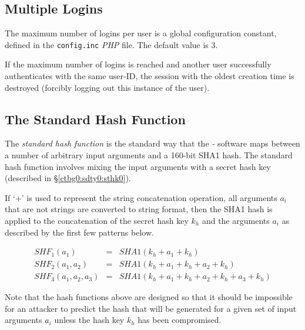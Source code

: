 \subsection{Multiple Logins}
\label{ctbg0:sddc0:smlo0}

The maximum number of logins per user is a global configuration
constant, defined in the \texttt{config.inc} \emph{PHP} file.
The default value is 3.

If the maximum number of logins is reached and another user 
successfully authenticates with the
same user-ID, the session with the oldest creation time is destroyed (forcibly
logging out this instance of the user).


\subsection{The Standard Hash Function}
\label{ctbg0:sddc0:sshf0}

The \emph{standard hash function} is the
standard way that the \emph{\productbasename{}-\productversion{}} software
maps between a number of arbitrary input arguments and a 160-bit
SHA1 hash.  The standard hash function involves mixing
the input arguments with a secret hash key
(described in \S{}\ref{ctbg0:sdty0:sthk0}).

If `+' is used to represent the string concatenation operation, all
arguments $a_i$ that are not strings are converted to string format, then the
SHA1 hash is applied to the concatenation of the secret hash key $k_h$ and the
arguments $a_i$ as described by the first few patterns below.

\begin{eqnarray}
\nonumber
SHF_1(a_1)              & = & SHA1(k_h + a_1 + k_h) \\
\label{eq:ctbg0:sddc0:sshf0:01}
SHF_2(a_1, a_2)         & = & SHA1(k_h + a_1 + k_h + a_2 + k_h) \\
\nonumber
SHF_3(a_1, a_2, a_3)    & = & SHA1(k_h + a_1 + k_h + a_2 + k_h + a_3 + k_h)
\end{eqnarray}

Note that the hash functions above are designed so that it should be
impossible for an attacker to predict the hash that will be generated
for a given set of input arguments $a_i$ unless the hash key $k_h$ has
been compromised.


